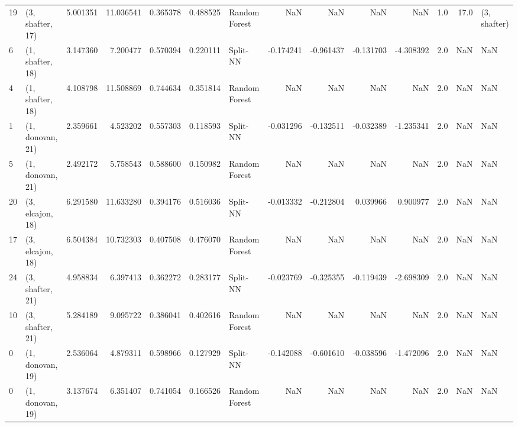 \begin{tabular}{llrrrrlrrrrrrl}
19 &  (3, shafter, 17) &   5.001351 &  11.036541 &   0.365378 &  0.488525 &  Random Forest &             NaN &           NaN &            NaN &          NaN &            1.0 &   17.0 &     (3, shafter) \\
6  &  (1, shafter, 18) &   3.147360 &   7.200477 &   0.570394 &  0.220111 &       Split-NN &       -0.174241 &     -0.961437 &      -0.131703 &    -4.308392 &            2.0 &    NaN &              NaN \\
4  &  (1, shafter, 18) &   4.108798 &  11.508869 &   0.744634 &  0.351814 &  Random Forest &             NaN &           NaN &            NaN &          NaN &            2.0 &    NaN &              NaN \\
1  &  (1, donovan, 21) &   2.359661 &   4.523202 &   0.557303 &  0.118593 &       Split-NN &       -0.031296 &     -0.132511 &      -0.032389 &    -1.235341 &            2.0 &    NaN &              NaN \\
5  &  (1, donovan, 21) &   2.492172 &   5.758543 &   0.588600 &  0.150982 &  Random Forest &             NaN &           NaN &            NaN &          NaN &            2.0 &    NaN &              NaN \\
20 &  (3, elcajon, 18) &   6.291580 &  11.633280 &   0.394176 &  0.516036 &       Split-NN &       -0.013332 &     -0.212804 &       0.039966 &     0.900977 &            2.0 &    NaN &              NaN \\
17 &  (3, elcajon, 18) &   6.504384 &  10.732303 &   0.407508 &  0.476070 &  Random Forest &             NaN &           NaN &            NaN &          NaN &            2.0 &    NaN &              NaN \\
24 &  (3, shafter, 21) &   4.958834 &   6.397413 &   0.362272 &  0.283177 &       Split-NN &       -0.023769 &     -0.325355 &      -0.119439 &    -2.698309 &            2.0 &    NaN &              NaN \\
10 &  (3, shafter, 21) &   5.284189 &   9.095722 &   0.386041 &  0.402616 &  Random Forest &             NaN &           NaN &            NaN &          NaN &            2.0 &    NaN &              NaN \\
0  &  (1, donovan, 19) &   2.536064 &   4.879311 &   0.598966 &  0.127929 &       Split-NN &       -0.142088 &     -0.601610 &      -0.038596 &    -1.472096 &            2.0 &    NaN &              NaN \\
0  &  (1, donovan, 19) &   3.137674 &   6.351407 &   0.741054 &  0.166526 &  Random Forest &             NaN &           NaN &            NaN &          NaN &            2.0 &    NaN &              NaN \\

\end{tabular}
